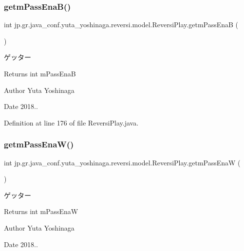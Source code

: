 \subsubsection{\texorpdfstring{getm\+Pass\+Ena\+B()}{getmPassEnaB()}}
{\footnotesize\ttfamily int jp.\+gr.\+java\+\_\+conf.\+yuta\+\_\+yoshinaga.\+reversi.\+model.\+Reversi\+Play.\+getm\+Pass\+EnaB (\begin{DoxyParamCaption}{ }\end{DoxyParamCaption})}



ゲッター 

\begin{DoxyReturn}{Returns}
int m\+Pass\+EnaB 
\end{DoxyReturn}
\begin{DoxyAuthor}{Author}
Yuta Yoshinaga 
\end{DoxyAuthor}
\begin{DoxyDate}{Date}
2018.. 
\end{DoxyDate}


Definition at line 176 of file Reversi\+Play.\+java.

\mbox{\label{classjp_1_1gr_1_1java__conf_1_1yuta__yoshinaga_1_1reversi_1_1model_1_1_reversi_play_a73d15ded7c188b5375828b710d89f8b7}} 
\subsubsection{\texorpdfstring{getm\+Pass\+Ena\+W()}{getmPassEnaW()}}
{\footnotesize\ttfamily int jp.\+gr.\+java\+\_\+conf.\+yuta\+\_\+yoshinaga.\+reversi.\+model.\+Reversi\+Play.\+getm\+Pass\+EnaW (\begin{DoxyParamCaption}{ }\end{DoxyParamCaption})}



ゲッター 

\begin{DoxyReturn}{Returns}
int m\+Pass\+EnaW 
\end{DoxyReturn}
\begin{DoxyAuthor}{Author}
Yuta Yoshinaga 
\end{DoxyAuthor}
\begin{DoxyDate}{Date}
2018.. 
\end{DoxyDate}


